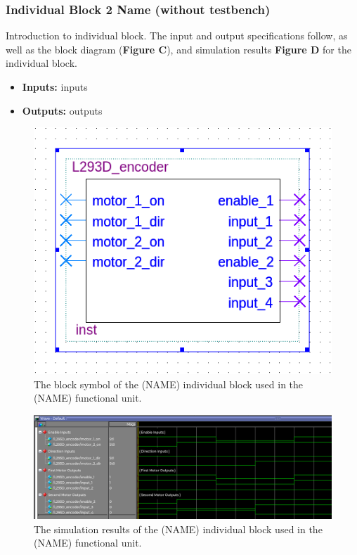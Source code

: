 \documentclass[a4paper]{article}
\begin{document}
\subsubsection{Individual Block 2 Name (without testbench)}
Introduction to individual block. The input and output specifications follow, as well as the block diagram (\textbf{Figure C}), and simulation results \textbf{Figure D} for the individual block.
\begin{itemize}
  \item \textbf{Inputs:  } inputs
  \item \textbf{Outputs: } outputs
\end{itemize}
\begin{figure}[h]
  \centering
  \includegraphics[width=.48\textwidth]{symbols/individual_placeholder.png}
  \caption{The block symbol of the (NAME) individual block used in the (NAME) functional unit.}
    \label{fig:individual-1-2-block}
\end{figure}
\begin{figure}[h]
  \centering
  \includegraphics[width=.98\textwidth]{sims/placeholder_sim.png}
  \caption{The simulation results of the (NAME) individual block used in the (NAME) functional unit.}
    \label{fig:individual-1-2-sim}
\end{figure}



\clearpage
\end{document}
